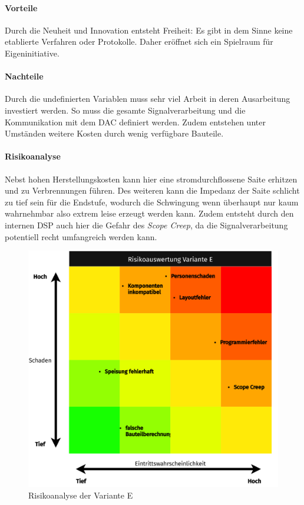 \paragraph{Vorteile} Durch die Neuheit und Innovation entsteht Freiheit: Es gibt in dem Sinne keine etablierte Verfahren oder Protokolle. Daher eröffnet sich ein Spielraum für Eigeninitiative.
\paragraph{Nachteile} Durch die undefinierten Variablen muss sehr viel Arbeit in deren Ausarbeitung investiert werden. So muss die gesamte Signalverarbeitung und die Kommunikation mit dem DAC definiert werden. Zudem entstehen unter Umständen weitere Kosten durch wenig verfügbare Bauteile.
\newpage
\paragraph{Risikoanalyse}
Nebst hohen Herstellungskosten kann hier eine stromdurchflossene Saite erhitzen und zu Verbrennungen führen. Des weiteren kann die Impedanz der Saite schlicht zu tief sein für die Endstufe, wodurch die Schwingung wenn überhaupt nur kaum wahrnehmbar also extrem leise erzeugt werden kann. Zudem entsteht durch den internen DSP auch hier die Gefahr des \textit{Scope Creep}, da die Signalverarbeitung potentiell recht umfangreich werden kann.
\begin{figure}[H]
	\vspace{1cm}
	\centering
	\includegraphics[width=\textwidth*4/5]{pictures/risks-Variante E.png}
	\caption{Risikoanalyse der Variante E}
\end{figure}
\newpage